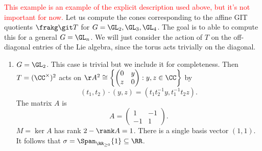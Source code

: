 \begin{example}
\textcolor{red}{This example is an example of the explicit description used above, but it's not important for now.}
Let us compute the cones corresponding to the affine GIT quotients $\frakg \git T$ for $G = \GL_2, \GL_3, \GL_4$.
The goal is to able to compute this for a general $G = \GL_n$.
We will just consider the action of $T$ on the off-diagonal entries of the Lie algebra, since the torus acts trivially on the diagonal.
\begin{enumerate}
\item
$G = \GL_2$.
This case is trivial but we include it for completeness.
Then $T = (\CC^\times)^2$ acts on $\AA^2 \cong \left\{\begin{pmatrix} 0 & y \\ z & 0 \end{pmatrix} : y, z \in \CC\right\}$ by
$$(t_1, t_2) \cdot (y, z) = (t_1 t_2^{-1} y, t_1^{-1} t_2 z).$$
The matrix $A$ is
$$A = \begin{pmatrix} 1 & -1 \\ -1 & 1 \end{pmatrix}.$$
$M = \ker A$ has rank $2 - \rank A = 1$.
There is a single basis vector $(1, 1)$.
It follows that $\sigma = \Span_{\RR_{\ge 0}} \{ 1 \} \subseteq \RR$.


\end{enumerate}
\end{example}
